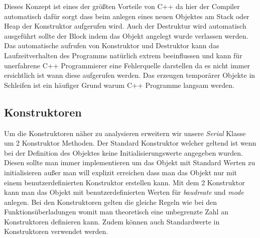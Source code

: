 \documentclass[MES,Master,ngerman]{twbook}%
\begin{document}
\begin{figure}[!htb]
	\begin{subfigure}[b]{0.5\textwidth}
		
		\label{fig:23}
	\end{subfigure}
	\begin{subfigure}[b]{0.5\textwidth}
		
		\label{fig:24}
	\end{subfigure}
\end{figure}
\newpage

Dieses Konzept ist eines der größten Vorteile von C++ da hier der Compiler automatisch dafür sorgt dass beim anlegen eines neuen Objektes am Stack oder Heap der Konstruktor aufgerufen wird. Auch der Destruktur wird automatisch ausgeführt sollte der Block indem das Objekt angelegt wurde verlassen werden. Das automatische aufrufen von Konstruktor und Destruktor kann das Laufzeitverhalten des Programms natürlich extrem beeinflussen und kann für unerfahrene C++ Programmierer eine Fehlerquelle darstellen da es nicht immer ersichtlich ist wann diese aufgerufen werden. Das erzeugen temporärer Objekte in Schleifen ist ein häufiger Grund warum C++ Programme langsam werden. 



\subsection{Konstruktoren}
Um die Konstruktoren näher zu analysieren erweitern wir unsere \textit{Serial} Klasse um 2 Konstruktor Methoden. Der Standard Konstruktor welcher geltend ist wenn bei der Definition des Objektes keine Initialisierungswerte angegeben wurden. Diesen sollte man immer implementieren um das Objekt mit Standard Werten zu initialisieren außer man will explizit erreichen dass man das Objekt nur mit einem benutzerdefinierten Konstruktor erstellen kann. Mit dem 2 Konstruktor kann man das Objekt mit benutzerdefinierten Werten für \textit{baudreate} und \textit{mode} anlegen. Bei den Konstruktoren gelten die gleiche Regeln wie bei den Funktionsüberladungen womit man theoretisch eine unbegrenzte Zahl an Konstruktoren definieren kann. Zudem können auch Standardwerte in Konstruktoren verwendet werden. 
\end{document}
